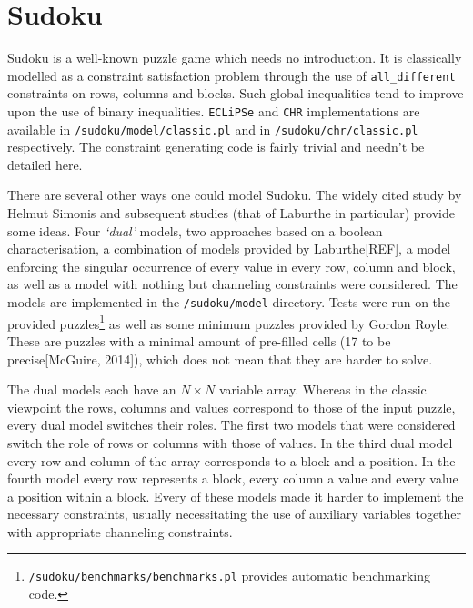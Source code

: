 \section{Sudoku}

Sudoku is a well-known puzzle game which needs no introduction. It is classically modelled as a constraint satisfaction problem through the use of \texttt{all\_different} constraints on rows, columns and blocks. Such global inequalities tend to improve upon the use of binary inequalities. \texttt{ECLiPSe} and \texttt{CHR} implementations are available in \texttt{/sudoku/model/classic.pl} and in \texttt{/sudoku/chr/classic.pl} respectively. The constraint generating code is fairly trivial and needn't be detailed here. \\\par

There are several other ways one could model Sudoku. The widely cited study by Helmut Simonis and subsequent studies (that of Laburthe in particular) provide some ideas. Four \textit{`dual'} models, two approaches based on a boolean characterisation, a combination of models provided by Laburthe[REF], a model enforcing the singular occurrence of every value in every row, column and block, as well as a model with nothing but channeling constraints were considered. The models are implemented in the \texttt{/sudoku/model} directory. Tests were run on the provided puzzles\footnote{\texttt{/sudoku/benchmarks/benchmarks.pl} provides automatic benchmarking code.} as well as some minimum puzzles provided by Gordon Royle. These are puzzles with a minimal amount of pre-filled cells (17 to be precise[McGuire, 2014]), which does not mean that they are harder to solve. \\\par

The dual models each have an $N\times N$ variable array. Whereas in the classic viewpoint the rows, columns and values correspond to those of the input puzzle, every dual model switches their roles. The first two models that were considered switch the role of rows or columns with those of values. In the third dual model every row and column of the array corresponds to a block and a position. In the fourth model every row represents a block, every column a value and every value a position within a block. Every of these models made it harder to implement the necessary constraints, usually necessitating the use of auxiliary variables together with appropriate channeling constraints.\\\par  

